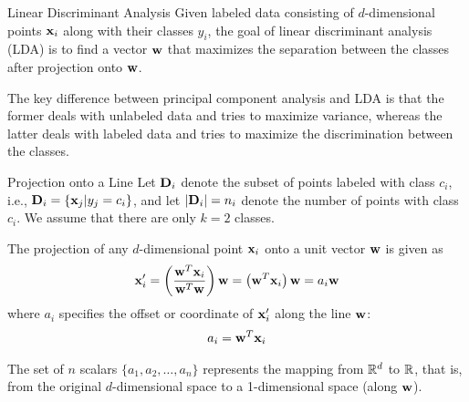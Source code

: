
\date{Chap.\ 20: Linear Discriminant Analysis}

\begin{frame}
\titlepage
\end{frame}

\begin{frame}{Linear Discriminant Analysis}
Given
labeled data consisting of $d$-dimensional points $\mathbf{x}_i$ along
with their classes $y_i$, the goal of linear discriminant analysis
(LDA) is to f\/{i}nd a vector $\mathbf{w}$ that maximizes the separation
between the classes after projection onto $\mathbf{w}$. 

\medskip
The key difference between principal component analysis and LDA is
that the former deals with unlabeled data and tries to maximize
variance, whereas the latter deals with labeled data and tries to
maximize the discrimination between the classes.
\end{frame}


\begin{frame}{Projection onto a Line}
 Let $\mathbf{D}_i$ denote the subset of points
labeled with class $c_i$, i.e., $\mathbf{D}_i = \{\mathbf{x}_{j} | y_{j} = c_i\}$,
and let $|\mathbf{D}_i| = n_i$ denote the number of points with
class $c_i$. We assume that there are only $k=2$ classes. 


\medskip
The projection  of any $d$-dimensional
point $\mathbf{x}_i$ onto a unit vector $\mathbf{w}$ is given as
\begin{align*}
  \mathbf{x}'_i = \left( \frac{\mathbf{w}^T \mathbf{x}_i}{\mathbf{w}^T\mathbf{w}} \right) \mathbf{w}
    = \left( \mathbf{w}^T \mathbf{x}_i \right) \mathbf{w} = a_i \mathbf{w}
\end{align*}
where $a_i$ specif\/{i}es the offset or coordinate of $\mathbf{x}'_i$ along
the line $\mathbf{w}$:
\begin{align*}
  a_i  = \mathbf{w}^T\mathbf{x}_i
\end{align*}

\medskip
The set of $n$ scalars $\{a_1, a_2, \ldots, a_n\}$ represents the mapping from ${\mathord{\mathbb R}}^d$ to ${\mathord{\mathbb R}}$, that is, from the original
$d$-dimensional space to a 1-dimensional space (along $\mathbf{w}$).
\end{frame}


